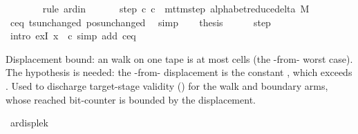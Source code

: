 \begin{isabellebody}
\ \ \ \ \ \ \isamarkupfalse%
\ {\isacharparenleft}{\kern0pt}rule\ ard{\isacharunderscore}{\kern0pt}in{\isacharparenright}{\kern0pt}\isanewline
\ \ \isamarkupfalse%
\isanewline
\ \ \isamarkupfalse%
\ step{\isacharcolon}{\kern0pt}\ {\isachardoublequoteopen}{\isacharparenleft}{\kern0pt}c{\isacharprime}{\kern0pt}{\isacharcomma}{\kern0pt}\ {\isacharquery}{\kern0pt}c{\isacharprime}{\kern0pt}{\isacharprime}{\kern0pt}{\isacharparenright}{\kern0pt}\ {\isasymin}\ mttm{\isacharunderscore}{\kern0pt}step\ {\isacharparenleft}{\kern0pt}alphabet{\isacharunderscore}{\kern0pt}reduce{\isacharunderscore}{\kern0pt}delta\ M{\isacharparenright}{\kern0pt}{\isachardoublequoteclose}\isanewline
\ \ \ \ \isamarkupfalse%
\ c{\isacharprime}{\kern0pt}{\isacharunderscore}{\kern0pt}eq\ ts{\isacharunderscore}{\kern0pt}unchanged\ pos{\isacharunderscore}{\kern0pt}unchanged\ \isamarkupfalse%
\ simp\isanewline
\ \ \isamarkupfalse%
\ {\isacharquery}{\kern0pt}thesis\isanewline
\ \ \ \ \isamarkupfalse%
\ step\ \isamarkupfalse%
\ {\isacharparenleft}{\kern0pt}intro\ exI{\isacharbrackleft}{\kern0pt}\ x\ {\isacharequal}{\kern0pt}\ {\isacharquery}{\kern0pt}c{\isacharprime}{\kern0pt}{\isacharprime}{\kern0pt}{\isacharbrackright}{\kern0pt}{\isacharparenright}{\kern0pt}\ {\isacharparenleft}{\kern0pt}simp\ add{\isacharcolon}{\kern0pt}\ c{\isacharprime}{\kern0pt}{\isacharunderscore}{\kern0pt}eq{\isacharparenright}{\kern0pt}\isanewline
{}\isamarkupfalse%
%
\endisatagproof
{\isafoldproof}%
%
\isadelimproof
%
\endisadelimproof
%
\begin{isamarkuptext}%
Displacement bound: an  walk on one tape
  is at most  cells (the -from-
  worst case).  The  hypothesis is needed: the
  -from- displacement is the constant ,
  which exceeds .  Used to discharge target-stage validity
  () for the walk and boundary arms, whose
  reached bit-counter is bounded by the displacement.%
\end{isamarkuptext}\isamarkuptrue%
\isamarkupfalse%
\ ar{\isacharunderscore}{\kern0pt}disp{\isacharunderscore}{\kern0pt}le{\isacharunderscore}{\kern0pt}{}k{\isacharcolon}{\kern0pt}\isanewline

\end{isabellebody}
